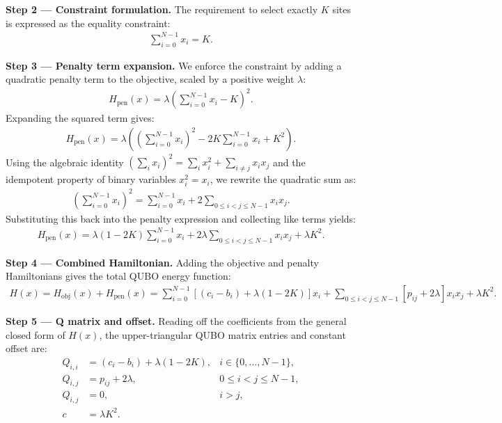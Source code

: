 \documentclass[12pt]{article}
\begin{document}
\textbf{Step 2 --- Constraint formulation.} The requirement to select exactly $K$ sites is expressed as the equality constraint:
\begin{align}
    \sum_{i=0}^{N-1} x_i = K.
\end{align}

\textbf{Step 3 --- Penalty term expansion.} We enforce the constraint by adding a quadratic penalty term to the objective, scaled by a positive weight $\lambda$:
\begin{align}
    H_{\text{pen}}(x) = \lambda \left( \sum_{i=0}^{N-1} x_i - K \right)^2.
\end{align}
Expanding the squared term gives:
\begin{align}
    H_{\text{pen}}(x) = \lambda \left( \left( \sum_{i=0}^{N-1} x_i \right)^2 - 2K \sum_{i=0}^{N-1} x_i + K^2 \right).
\end{align}
Using the algebraic identity $\left( \sum_{i} x_i \right)^2 = \sum_{i} x_i^2 + \sum_{i \neq j} x_i x_j$ and the idempotent property of binary variables $x_i^2 = x_i$, we rewrite the quadratic sum as:
\begin{align}
    \left( \sum_{i=0}^{N-1} x_i \right)^2 = \sum_{i=0}^{N-1} x_i + 2 \sum_{0 \le i < j \le N-1} x_i x_j.
\end{align}
Substituting this back into the penalty expression and collecting like terms yields:
\begin{align}
    H_{\text{pen}}(x) = \lambda(1 - 2K) \sum_{i=0}^{N-1} x_i + 2\lambda \sum_{0 \le i < j \le N-1} x_i x_j + \lambda K^2.
\end{align}

\textbf{Step 4 --- Combined Hamiltonian.} Adding the objective and penalty Hamiltonians gives the total QUBO energy function:
\begin{align}
    H(x) = H_{\text{obj}}(x) + H_{\text{pen}}(x) = \sum_{i=0}^{N-1} \left[ (c_i - b_i) + \lambda(1 - 2K) \right] x_i + \sum_{0 \le i < j \le N-1} \left[ p_{ij} + 2\lambda \right] x_i x_j + \lambda K^2.
\end{align}

\textbf{Step 5 --- Q matrix and offset.} Reading off the coefficients from the general closed form of $H(x)$, the upper-triangular QUBO matrix entries and constant offset are:
\begin{align}
    Q_{i,i} &= (c_i - b_i) + \lambda(1 - 2K), & i \in \{0, \dots, N-1\}, \\
    Q_{i,j} &= p_{ij} + 2\lambda, & 0 \le i < j \le N-1, \\
    Q_{i,j} &= 0, & i > j, \\
    c &= \lambda K^2. &
\end{align}
\end{document}
